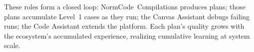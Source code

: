 These roles form a closed loop: NormCode~Compilations produces plans; those plans
accumulate Level~1 cases as they run; the Canvas Assistant debugs failing runs;
the Code Assistant extends the platform. Each plan's quality grows with the
ecosystem's accumulated experience, realizing cumulative learning at system scale.

